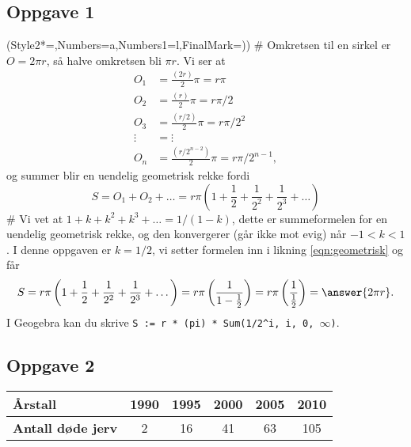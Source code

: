 \subsection*{Oppgave 1}
\begin{easylist}[enumerate]
\ListProperties(Style2*=,Numbers=a,Numbers1=l,FinalMark={)})
# Omkretsen til en sirkel er $O = 2 \pi r$, så halve omkretsen bli $\pi r$.
Vi ser at 
\begin{align*}
	O_1 &=  \frac{(2r)}{2} \pi = r \pi \\
	O_2 &=  \frac{(r)}{2} \pi = r \pi /2 \\
	O_3 &=  \frac{(r/2)}{2} \pi = r \pi / 2^2 \\
	\vdots &= \vdots \\
	O_n &=  \frac{(r/2^{n-2})}{2} \pi = r \pi / 2^{n-1},
\end{align*}
og summer blir en uendelig geometrisk rekke fordi
\begin{equation}
\label{eqn:geometrisk}
	S = O_1 + O_2  + \dots =  r \pi \left( 1 + \frac{1}{2} + 
	\frac{1}{2^2} + \frac{1}{2^3} + \dots \right)
\end{equation}
# Vi vet at $1 + k + k^2 + k^3 + \dots = 1/ (1-k)$, dette er summeformelen for en uendelig geometrisk rekke, og den konvergerer (går ikke mot evig) når $-1 < k < 1$. I denne oppgaven er $k = 1/2$, vi setter formelen inn i likning \eqref{eqn:geometrisk} og får 
\begin{equation*}
S =  r \pi \left( 1 + \frac{1}{2} + 
\frac{1}{2^2} + \frac{1}{2^3} + \dots \right)
=  r \pi \left( \frac{1}{1 - \frac{1}{2}} \right)
=  r \pi \left( \frac{1}{\frac{1}{2}} \right)
 = \answer{2 \pi r}.
\end{equation*}
I Geogebra kan du skrive \verb|S := r * (pi) * Sum(1/2^i, i, 0, |$\infty$\verb|)|.
\end{easylist}

\subsection*{Oppgave 2}

\begin{center}
	\begin{tabular}{|l|c|c|c|c|c|}
		\hline
		\textbf{Årstall} & 1990 & 1995 & 2000 & 2005 & 2010 \\ \hline
		\textbf{Antall døde jerv} & 2 & 16 & 41 & 63 & 105 \\ \hline
	\end{tabular}
\end{center}


